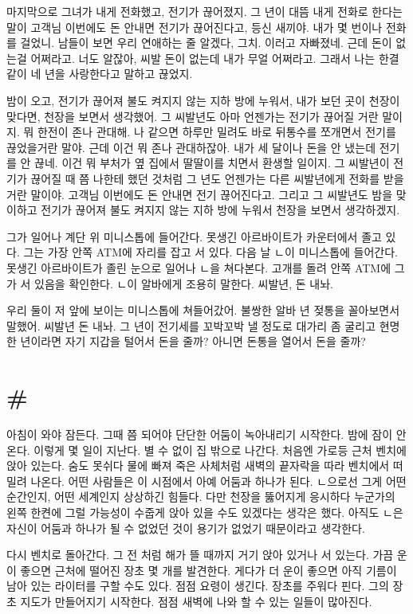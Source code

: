 \documentclass[a5paper,10pt, twoside, openright]{memoir}
\begin{document}
	마지막으로 그녀가 내게 전화했고, 전기가 끊어졌지. 그 년이 대뜸 내게 전화로 한다는 말이 고객님 이번에도 돈 안내면 전기가 끊어진다고, 등신 새끼야. 내가 몇 번이나 전화를 걸었니. 남들이 보면 우리 연애하는 줄 알겠다, 그치. 이러고 자빠졌네. 근데 돈이 없는걸 어쩌라고. 너도 알잖아, 씨발 돈이 없는데 내가 무얼 어쩌라고. 그래서 나는 한결같이 네 년을 사랑한다고 말하고 끊었지.

	밤이 오고, 전기가 끊어져 불도 켜지지 않는 지하 방에 누워서, 내가 보던 곳이 천장이 맞다면, 천장을 보면서 생각했어. 그 씨발년도 아마 언젠가는 전기가 끊어질 거란 말이지. 뭐 한전이 존나 관대해. 나 같으면 하루만 밀려도 바로 뒤통수를 쪼개면서 전기를 끊었을거란 말야. 근데 이건 뭐 존나 관대하잖아. 내가 세 달이나 돈을 안 냈는데 전기를 안 끊네. 이건 뭐 부처가 옆 집에서 딸딸이를 치면서 환생할 일이지. 그 씨발년이 전기가 끊어질 때 쯤 나한테 했던 것처럼 그 년도 언젠가는 다른 씨발년에게 전화를 받을거란 말이야. 고객님 이번에도 돈 안내면 전기 끊어진다고. 그리고 그 씨발년도 밤을 맞이하고 전기가 끊어져 불도 켜지지 않는 지하 방에 누워서 천장을 보면서 생각하겠지.

	그가 일어나 계단 위 미니스톱에 들어간다. 못생긴 아르바이트가 카운터에서 졸고 있다. 그는 가장 안쪽 ATM에 자리를 잡고 서 있다. 다음 날 ㄴ이 미니스톱에 들어간다. 못생긴 아르바이트가 졸린 눈으로 일어나 ㄴ을 쳐다본다. 고개를 돌려 안쪽 ATM에 그가 서 있음을 확인한다. ㄴ이 알바에게 조용히 말한다. 씨발년, 돈 내놔.

	우리 둘이 저 앞에 보이는 미니스톱에 쳐들어갔어. 불쌍한 알바 년 젖통을 꼴아보면서 말했어. 씨발년 돈 내놔. 그 년이 전기세를 꼬박꼬박 낼 정도로 대가리 좀 굴리고 현명한 년이라면 자기 지갑을 털어서 돈을 줄까? 아니면 돈통을 열어서 돈을 줄까? 

	\section{\#}
	아침이 와야 잠든다. 그때 쯤 되어야 단단한 어둠이 녹아내리기 시작한다. 밤에 잠이 안온다. 이렇게 몇 일이 지난다. 별 수 없이 집 밖으로 나간다. 처음엔 가로등 근처 벤치에 앉아 있는다. 숨도 못쉬다 물에 빠져 죽은 사체처럼 새벽의 끝자락을 따라 벤치에서 떠밀려 나온다. 어떤 사람들은 이 시점에서 아예 어둠과 하나가 된다. ㄴ으로선 그게 어떤 순간인지, 어떤 세계인지 상상하긴 힘들다. 다만 천장을 뚫어지게 응시하다 누군가의 왼쪽 한켠에 그럴 가능성이 수줍게 앉아 있을 수도 있겠다는 생각은 했다. 아직도 ㄴ은 자신이 어둠과 하나가 될 수 없었던 것이 용기가 없었기 때문이라고 생각한다. 

	다시 벤치로 돌아간다. 그 전 처럼 해가 뜰 때까지 거기 앉아 있거나 서 있는다. 가끔 운이 좋으면 근처에 떨어진 장초 몇 개를 발견한다. 게다가 더 운이 좋으면 아직 기름이 남아 있는 라이터를 구할 수도 있다. 점점 요령이 생긴다. 장초를 주워다 핀다. 그의 장초 지도가 만들어지기 시작한다. 점점 새벽에 나와 할 수 있는 일들이 많아진다.
	
\end{document}
